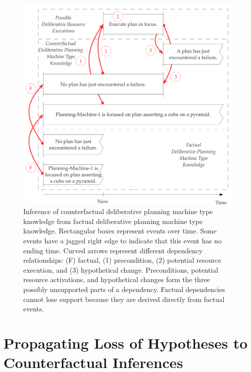 \begin{figure}[h]
\centering
\includegraphics[width=12cm]{gfx/inference_of_deliberative_planning_machine_knowledge}
\caption[Inference of counterfactual deliberative planning machine
  type knowledge from factual deliberative planning machine type
  knowledge.]{Inference of counterfactual deliberative planning
  machine type knowledge from factual deliberative planning machine
  type knowledge.  Rectangular boxes represent events over time.  Some
  events have a jagged right edge to indicate that this event has no
  ending time.  Curved arrows represent different dependency
  relationships: (F) factual, (1) precondition, (2) potential resource
  execution, and (3) hypothetical change.  Preconditions, potential
  resource activations, and hypothetical changes form the three
  possibly unsupported parts of a dependency.  Factual dependencies
  cannot lose support because they are derived directly from factual
  events.}
\label{figure:inference_of_deliberative_planning_machine_knowledge}
\end{figure}


\section{Propagating Loss of Hypotheses to Counterfactual Inferences}

